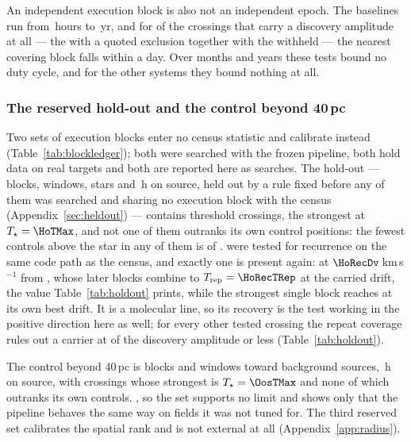 An independent execution block is also not an independent epoch. The
baselines run from \RcSepMinH\,hours to \RcSepMaxYr\,yr, and for
\RcNSepSameDay{} of the \RcNExclPoss{} crossings that carry a discovery
amplitude at all --- the \RcNExcl{} with a quoted exclusion together with the
\RcNWithheld{} withheld --- the nearest covering block falls within a day. Over months and years these tests
bound no duty cycle, and for the other \RcNoRepSys{} systems they bound
nothing at all.

\subsubsection{The reserved hold-out and the control beyond 40\,pc}
\label{sec:holdoutsearch}

Two sets of execution blocks enter no census statistic and calibrate instead
(Table~\ref{tab:blockledger}); both were searched with the frozen pipeline,
both hold data on real targets and both are reported here as searches. The hold-out --- \HoNBlock{}
blocks, \HoNWin{} windows, \HoNStar{} stars and \HoHours\,h on source,
held out by a rule fixed before any of them was searched and sharing no execution
block with the census (Appendix~\ref{sec:heldout}) --- contains \HoNCross{}
threshold crossings, the strongest at $T_\star=\HoTMax$, and not one of them
outranks its own control positions: the fewest controls above the star in any
of them is \HoNCtrlMin{} of \NCtrl. \HoNTested{} were tested for recurrence on the same
code path as the census, and exactly one is present again: \HoRecStar{} at
$\HoRecDv$\,km\,s$^{-1}$ from \HoRecLine, whose \HoRecNRep{} later blocks
combine to $T_{\rm rep}=\HoRecTRep$ at the carried drift, the value
Table~\ref{tab:holdout} prints, while the strongest single block reaches
\HoRecTAnyDrift{} at its own best drift. It is a molecular line, so its
recovery is the test working in the positive direction here as well; for
every other tested crossing the repeat coverage rules out a carrier at
\HoFracMax{} of the discovery amplitude or less (Table~\ref{tab:holdout}).

The control beyond 40\,pc is \OosNBlock{} blocks and \OosNWin{} windows toward
\OosNStar{} background sources, \OosHours\,h on source, with \OosNCross{}
crossings whose strongest is $T_\star=\OosTMax$ and none of which outranks its
own controls. \OosVsysClause, so the set supports no limit and shows only that
the pipeline behaves the same way on fields it was not tuned for. The third reserved set calibrates the spatial rank
and is not external at all (Appendix~\ref{app:radius}).

